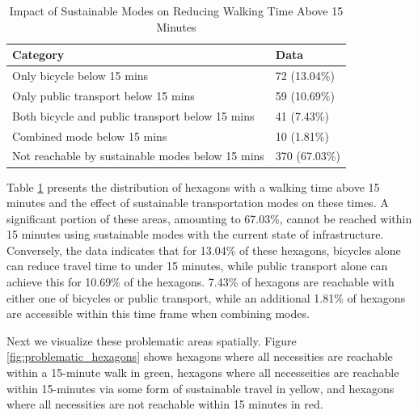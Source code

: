 \begin{table}[h]
  \centering
  \begin{tabular}{|l|l|}
    \hline
    \textbf{Category}                                          & \textbf{Data}                \\ \hline
    Only bicycle below 15 mins                                 & 72 (13.04\%)                 \\ \hline
    Only public transport below 15 mins                        & 59 (10.69\%)                 \\ \hline
    Both bicycle and public transport below 15 mins            & 41 (7.43\%)                  \\ \hline
    Combined mode below 15 mins                                & 10 (1.81\%)                  \\ \hline
    Not reachable by sustainable modes below 15 mins           & 370 (67.03\%)                \\ \hline
  \end{tabular}
  \caption{Impact of Sustainable Modes on Reducing Walking Time Above 15 Minutes}
  \label{table:hexagons_with_walking_time_above_15_minutes}
\end{table}

Table \ref{table:hexagons_with_walking_time_above_15_minutes} presents the distribution of hexagons with a walking time above 15 minutes and the effect of sustainable transportation modes on these times. 
A significant portion of these areas, amounting to 67.03\%, cannot be reached within 15 minutes using sustainable modes with the current state of infrastructure. 
Conversely, the data indicates that for 13.04\% of these hexagons, bicycles alone can reduce travel time to under 15 minutes, while public transport alone can achieve this for 10.69\% of the hexagons. 
7.43\% of hexagons are reachable with either one of bicycles or public transport, while an additional 1.81\% of hexagons are accessible within this time frame when combining  modes. 


Next we visualize these problematic areas spatially.
Figure \ref{fig:problematic_hexagons} shows hexagons where all necessities are reachable within a 15-minute walk in green, hexagons where all necesseities are reachable within 15-minutes via some form of sustainable travel in yellow, and hexagons where all necessities are not reachable within 15 minutes in red.

